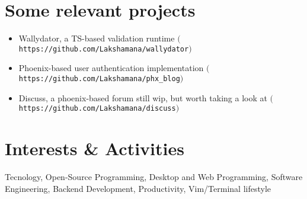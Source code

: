 \documentclass[a4paper,10pt]{article}
\begin{document}
\section{Some relevant projects}
\begin{flushleft}
\begin{itemize}
  \item Wallydator, a TS-based validation runtime $($\texttt{https://github.com/Lakshamana/wallydator}$)$
  \item Phoenix-based user authentication implementation $($\texttt{https://github.com/Lakshamana/phx\_blog}$)$
  \item Discuss, a phoenix-based forum still wip, but worth taking a look at $($\texttt{https://github.com/Lakshamana/discuss}$)$
\end{itemize}
\end{flushleft}

\section{Interests \& Activities}
\raggedright{Tecnology, Open-Source Programming, Desktop and Web Programming, Software Engineering, Backend Development, Productivity, Vim/Terminal lifestyle}

\end{document}
